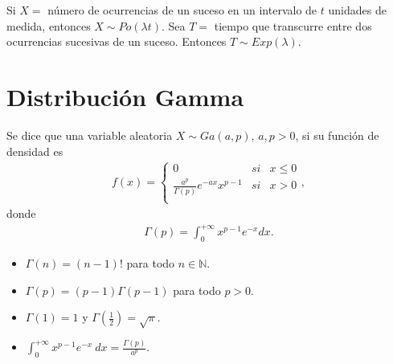 Si $X = $ número de ocurrencias de un suceso en un intervalo de $t$ unidades de medida, entonces $X\sim Po(\lambda t)$. Sea $T = $ tiempo que transcurre entre dos ocurrencias sucesivas de un suceso. Entonces $T \sim Exp(\lambda)$.

\section{Distribución Gamma}

\begin{defi}
    Se dice que una variable aleatoria $X \sim Ga(a,p)$, $a,p > 0$, si su función de densidad es
    \begin{align*}
        f(x) = \left\{ \begin{array}{lcc}
                           0                                   & si & x \leq 0 \\
                           \frac{a^p}{\Gamma(p)}e^{-ax}x^{p-1} & si & x > 0    \\
                       \end{array}
        \right. ,
    \end{align*}
    donde
    \begin{align*}
        \Gamma(p) = \int_{0}^{+\infty}{x^{p-1}e^{-x}  dx}.
    \end{align*}
\end{defi}

\begin{obs}
    \begin{itemize}
        \item $\Gamma(n) = (n-1)!$ para todo $n \in \mathbb{N}$.
        \item $\Gamma(p) = (p-1)\Gamma(p-1)$ para todo $p > 0$.
        \item $\Gamma(1) = 1$ y $\Gamma\left( \frac{1}{2}\right) = \sqrt{\pi}$.
        \item $\int_{0}^{+\infty}{x^{p-1}e^{-x} \ dx} = \frac{\Gamma(p)}{a^p}$.
    \end{itemize}
\end{obs}

